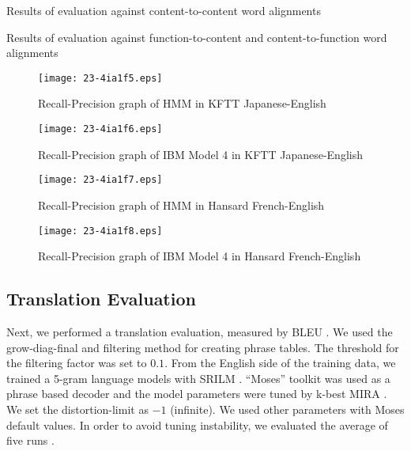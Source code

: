 \documentclass[english]{jnlp_1.4}
\begin{document}
\begin{table}[t]
  \caption{Results of evaluation against content-to-content word alignments}
 \label{alignment:c2c}

\end{table}
\begin{table}[t]
  \caption{Results of evaluation against function-to-content and content-to-function word alignments}
 \label{alignment:f2c}

\end{table}

\begin{figure}[p]
\begin{center}
\texttt{[image: 23-4ia1f5.eps]}
\end{center}
    \caption{Recall-Precision graph of HMM in KFTT Japanese-English}
    \label{fig:pr_kftt_hmm}
\end{figure}
\begin{figure}[p]
\begin{center}
\texttt{[image: 23-4ia1f6.eps]}
\end{center}
    \caption{Recall-Precision graph of IBM Model 4 in KFTT Japanese-English}
    \label{fig:pr_kftt_m4}
\end{figure}



\begin{figure}[p]
\begin{center}
\texttt{[image: 23-4ia1f7.eps]}
\end{center}
    \caption{Recall-Precision graph of HMM in Hansard French-English}
    \label{fig:pr_hansard_hmm}
\end{figure}
\begin{figure}[p]
\begin{center}
\texttt{[image: 23-4ia1f8.eps]}
\end{center}
    \caption{Recall-Precision graph of IBM Model 4 in Hansard French-English}
    \label{fig:pr_hansard_m4}
\end{figure}


\subsection{Translation Evaluation}

Next, we performed  a translation evaluation, measured by BLEU \cite{papineni2002bleu}.
We used the grow-diag-final and filtering method \cite{liang-taskar-klein:2006:HLT-NAACL06-Main} for creating phrase tables.
The threshold for the filtering factor was set to $0.1$.
From the English side of the training data, we trained a 5-gram language models with SRILM \cite{stolcke2002srilm}.
``Moses'' toolkit was used as a phrase based decoder \cite{koehn2007moses} and the model parameters were tuned by k-best MIRA \cite{cherry2012batch}.
We set the distortion-limit as $-1$ (infinite).
We used other parameters with Moses default values.
In order to avoid tuning instability, we evaluated the average of five runs \cite{hopkins2011tuning}.
\end{document}
